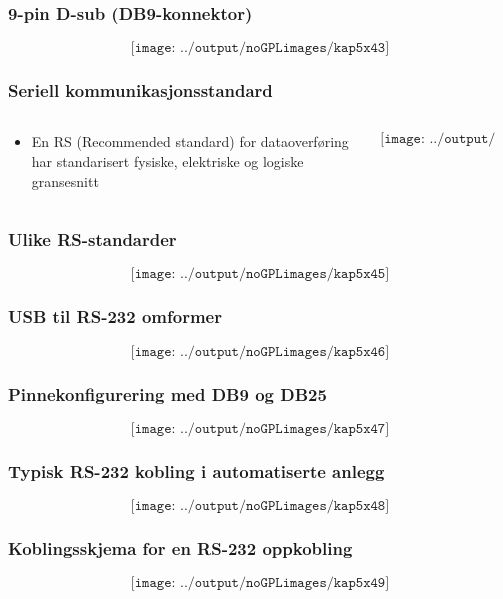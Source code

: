 \documentclass[aspectratio=169,xcolor=dvipsnames]{beamer}
\begin{document}
\begin{frame}
	\frametitle{9-pin D-sub (DB9-konnektor)}
	$$\texttt{[image: ../output/noGPLimages/kap5x43]}$$
\end{frame}
\begin{frame}
	\frametitle{Seriell kommunikasjonsstandard}
	\begin{columns}
		\begin{column}{0.5\textwidth}

			\begin{itemize}
				\item En RS (Recommended standard) for dataoverføring har standarisert fysiske, elektriske og logiske gransesnitt 
			\end{itemize}

			
		\end{column}

		\begin{column}{0.5\textwidth}
	$$\texttt{[image: ../output/noGPLimages/kap5x44]}$$
		\end{column}
	\end{columns}
\end{frame}
\begin{frame}
	\frametitle{Ulike RS-standarder}
	$$\texttt{[image: ../output/noGPLimages/kap5x45]}$$
\end{frame}
\begin{frame}
	\frametitle{USB til RS-232 omformer}
	$$\texttt{[image: ../output/noGPLimages/kap5x46]}$$
\end{frame}
\begin{frame}
	\frametitle{Pinnekonfigurering med DB9 og DB25}
	$$\texttt{[image: ../output/noGPLimages/kap5x47]}$$
\end{frame}
\begin{frame}
	\frametitle{Typisk RS-232 kobling i automatiserte anlegg}
	$$\texttt{[image: ../output/noGPLimages/kap5x48]}$$
\end{frame}
\begin{frame}
	\frametitle{Koblingsskjema for en RS-232 oppkobling }
	$$\texttt{[image: ../output/noGPLimages/kap5x49]}$$
\end{frame}
\end{document}
